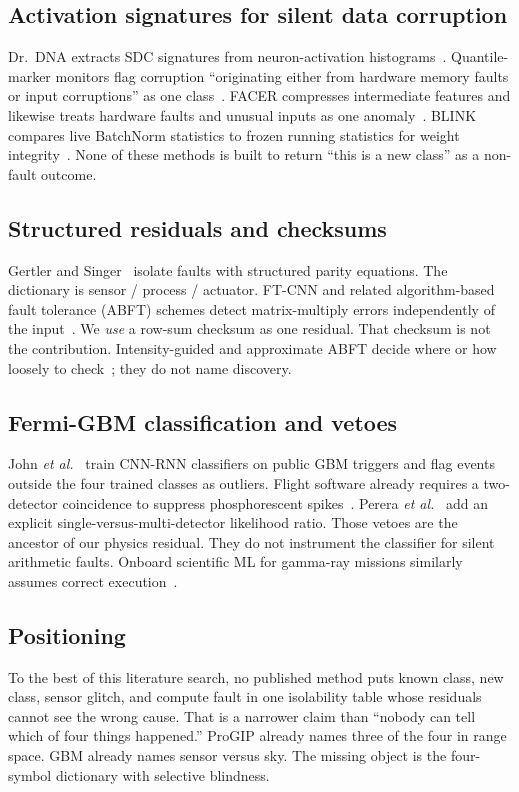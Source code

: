 \documentclass{ieeeaccess}
\begin{document}
\subsection{Activation signatures for silent data corruption}
Dr.~DNA extracts SDC signatures from neuron-activation histograms~\cite{drdna2024}. Quantile-marker monitors flag corruption ``originating either from hardware memory faults or input corruptions'' as one class~\cite{geissler2023}. FACER compresses intermediate features and likewise treats hardware faults and unusual inputs as one anomaly~\cite{schorn2020}. BLINK compares live BatchNorm statistics to frozen running statistics for weight integrity~\cite{blink2026}. None of these methods is built to return ``this is a new class'' as a non-fault outcome.

\subsection{Structured residuals and checksums}
Gertler and Singer~\cite{gertler1990} isolate faults with structured parity equations. The dictionary is sensor / process / actuator. FT-CNN and related algorithm-based fault tolerance (ABFT) schemes detect matrix-multiply errors independently of the input~\cite{ftcnn2020}. We \emph{use} a row-sum checksum as one residual. That checksum is not the contribution. Intensity-guided and approximate ABFT decide where or how loosely to check~\cite{kosaian2021,approxabft2023}; they do not name discovery.

\subsection{Fermi-GBM classification and vetoes}
John \textit{et al.}~\cite{john2025} train CNN-RNN classifiers on public GBM triggers and flag events outside the four trained classes as outliers. Flight software already requires a two-detector coincidence to suppress phosphorescent spikes~\cite{meegan2009}. Perera \textit{et al.}~\cite{perera2025} add an explicit single-versus-multi-detector likelihood ratio. Those vetoes are the ancestor of our physics residual. They do not instrument the classifier for silent arithmetic faults. Onboard scientific ML for gamma-ray missions similarly assumes correct execution~\cite{bulgarelli2025}.

\subsection{Positioning}
To the best of this literature search, no published method puts known class, new class, sensor glitch, and compute fault in one isolability table whose residuals cannot see the wrong cause. That is a narrower claim than ``nobody can tell which of four things happened.'' ProGIP already names three of the four in range space. GBM already names sensor versus sky. The missing object is the four-symbol dictionary with selective blindness.
\end{document}
